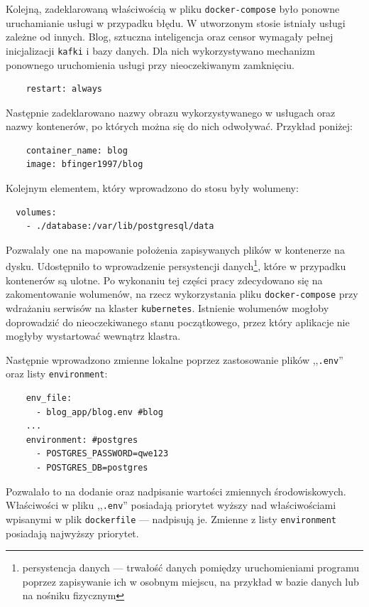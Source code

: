 \documentclass[12pt,twoside]{article}
\begin{document}
Kolejną, zadeklarowaną właściwością w pliku \texttt{docker-compose} było ponowne uruchamianie usługi w przypadku błędu. W utworzonym stosie istniały usługi zależne od innych. Blog, sztuczna inteligencja oraz censor wymagały pełnej inicjalizacji \texttt{kafki} i bazy danych. Dla nich wykorzystywano mechanizm ponownego uruchomienia usługi przy nieoczekiwanym zamknięciu.
\begin{lstlisting}
    restart: always
\end{lstlisting}
Następnie zadeklarowano nazwy obrazu wykorzystywanego w usługach oraz nazwy kontenerów, po których można się do nich odwoływać. Przykład poniżej:
\begin{lstlisting}
    container_name: blog
    image: bfinger1997/blog
\end{lstlisting}
Kolejnym elementem, który wprowadzono do stosu były wolumeny:
\begin{lstlisting}
  volumes:
    - ./database:/var/lib/postgresql/data
\end{lstlisting}
Pozwalały one na mapowanie położenia zapisywanych plików w kontenerze na dysku. Udostępniło to wprowadzenie persystencji danych\footnote{persystencja danych — trwałość danych pomiędzy uruchomieniami programu poprzez zapisywanie ich w osobnym miejscu, na przykład w bazie danych lub na nośniku fizycznym}, które w przypadku kontenerów są ulotne. Po wykonaniu tej części pracy zdecydowano się na zakomentowanie wolumenów, na rzecz wykorzystania pliku \texttt{docker-compose} przy wdrażaniu serwisów na klaster \texttt{kubernetes}. Istnienie wolumenów mogłoby doprowadzić do nieoczekiwanego stanu początkowego, przez który aplikacje nie mogłyby wystartować wewnątrz klastra.

Następnie wprowadzono zmienne lokalne poprzez zastosowanie plików ,,\texttt{.env}'' oraz listy \texttt{environment}:
\begin{lstlisting}
    env_file:
      - blog_app/blog.env #blog
   	...
   	environment: #postgres
      - POSTGRES_PASSWORD=qwe123
      - POSTGRES_DB=postgres
\end{lstlisting}
Pozwalało to na dodanie oraz nadpisanie wartości zmiennych środowiskowych. Właściwości w pliku ,,\texttt{.env}'' posiadają priorytet wyższy nad właściwościami wpisanymi w plik \texttt{dockerfile} — nadpisują je. Zmienne z listy \texttt{environment} posiadają najwyższy priorytet.
\end{document}
